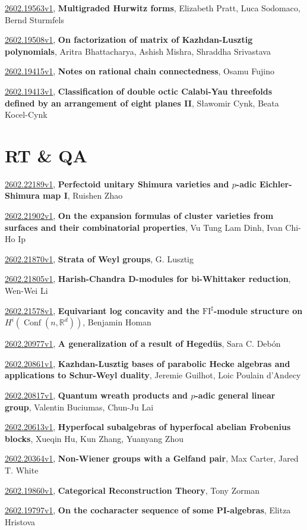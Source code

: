 \documentclass[9pt, a4paper]{article}
\theoremstyle{plain}
\theoremstyle{definition}
\theoremstyle{remark}
\newcommand{\arxiv}[3]{\href{https://arxiv.org/abs/#1}{#1}, \textbf{\textcolor{arxivblue}{#2}}, #3}
\begin{document}
\arxiv{2602.19563v1}{Multigraded Hurwitz forms}{Elizabeth Pratt, Luca Sodomaco, Bernd Sturmfels}

\arxiv{2602.19508v1}{On factorization of matrix of Kazhdan-Lusztig polynomials}{Aritra Bhattacharya, Ashish Mishra, Shraddha Srivastava}

\arxiv{2602.19415v1}{Notes on rational chain connectedness}{Osamu Fujino}

\arxiv{2602.19413v1}{Classification of double octic Calabi-Yau threefolds defined by an arrangement of eight planes II}{Sławomir Cynk, Beata Kocel-Cynk}


\section{RT \& QA}
\arxiv{2602.22189v1}{Perfectoid unitary Shimura varieties and $p$-adic Eichler-Shimura map I}{Ruishen Zhao}

\arxiv{2602.21902v1}{On the expansion formulas of cluster varieties from surfaces and their combinatorial properties}{Vu Tung Lam Dinh, Ivan Chi-Ho Ip}

\arxiv{2602.21870v1}{Strata of Weyl groups}{G. Lusztig}

\arxiv{2602.21805v1}{Harish-Chandra D-modules for bi-Whittaker reduction}{Wen-Wei Li}

\arxiv{2602.21578v1}{Equivariant log concavity and the $\operatorname{FI^\sharp}$-module structure on $H^i(\operatorname{Conf}(n,\mathbb{R}^d))$}{Benjamin Homan}

\arxiv{2602.20977v1}{A generalization of a result of Hegedüs}{Sara C. Debón}

\arxiv{2602.20861v1}{Kazhdan-Lusztig bases of parabolic Hecke algebras and applications to Schur-Weyl duality}{Jeremie Guilhot, Loic Poulain d'Andecy}

\arxiv{2602.20817v1}{Quantum wreath products and $p$-adic general linear group}{Valentin Buciumas, Chun-Ju Lai}

\arxiv{2602.20613v1}{Hyperfocal subalgebras of hyperfocal abelian Frobenius blocks}{Xueqin Hu, Kun Zhang, Yuanyang Zhou}

\arxiv{2602.20364v1}{Non-Wiener groups with a Gelfand pair}{Max Carter, Jared T. White}

\arxiv{2602.19860v1}{Categorical Reconstruction Theory}{Tony Zorman}

\arxiv{2602.19797v1}{On the cocharacter sequence of some PI-algebras}{Elitza Hristova}
\end{document}
